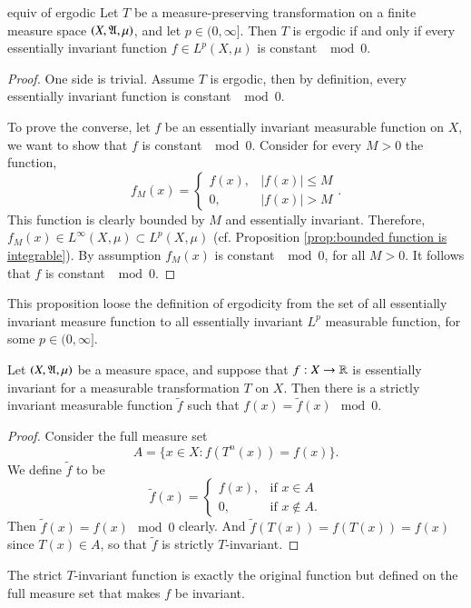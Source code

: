 \documentclass[12pt,a4paper]{article}
\begin{document}
	\begin{proposition}{}{equiv of ergodic}
		Let $T$ be a measure-preserving transformation on a finite measure space $(X,\mathfrak{A},\mu)$, and let $p\in (0,\infty]$. Then $T$ is ergodic if and only if every essentially invariant function $f\in L^p(X,\mu)$ is constant $\mod 0$.
	\end{proposition}
	\begin{proof}
		One side is trivial. Assume $T$ is ergodic, then by definition, every essentially invariant function is constant $\mod 0$. 
		
		To prove the converse, let $f$ be an essentially invariant measurable function on $X$, we want to show that $f$ is constant $\mod 0$. Consider for every $M>0$ the function, 
		$$
		f_M(x)=\begin{cases}
			f(x) ,& |f(x)|\leq M\\
			0 ,& |f(x)|>M
		\end{cases}.
		$$
		This function is clearly bounded by $M$ and essentially invariant. Therefore, $f_M(x)\in L^\infty (X,\mu)\subset L^p(X,\mu)$ (cf. Proposition \ref{prop:bounded function is integrable}). By assumption $f_M(x)$ is constant $\mod 0$, for all $M>0$. It follows that $f$ is constant $\mod 0$.
	\end{proof}
	This proposition loose the definition of ergodicity from the set of all essentially invariant measure function to all essentially invariant $L^p$ measurable function, for some $p\in (0,\infty]$.
	
	\begin{proposition}{}{}
		Let $(X,\mathfrak{A},\mu)$ be a measure space, and suppose that $f:X\rightarrow \mathbb{R}$ is essentially invariant for a measurable transformation $T$ on $X$. Then there is a strictly invariant measurable function $\tilde{f}$ such that $f(x)=\tilde{f}(x)\mod 0$.
	\end{proposition}
	\begin{proof}
		Consider the full measure set 
		$$
		A=\{x\in X:f(T^n(x))=f(x)\}.
		$$
		We define $\tilde{f}$ to be 
		$$
		\tilde{f}(x)=\begin{cases}
			f(x), & \text{if $x\in A$}\\
			0, & \text{if $x\notin A$}.
		\end{cases}
		$$
		Then $\tilde{f}(x)=f(x)\mod 0$ clearly. And $\tilde{f}(T(x))=f(T(x))=f(x)$ since $T(x)\in A$, so that $\tilde{f}$ is strictly $T$-invariant.
	\end{proof}
	The strict $T$-invariant function is exactly the original function but defined on the full measure set that makes $f$ be invariant.
	
\end{document}
